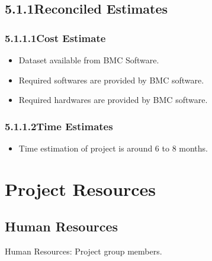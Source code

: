 \documentclass[oneside,a4paper,12pt]{book}
\begin{document}
\subsection*{5.1.1\hspace*{10pt}Reconciled Estimates}


\subsubsection*{5.1.1.1\hspace*{10pt}Cost Estimate}
\setlength{\parskip}{0.0pt}
\begin{itemize}
	\item Dataset available from BMC Software.\par

	\item Required softwares are provided by BMC software.\par

	\item Required hardwares are provided by BMC software.
\end{itemize}\par


\subsubsection*{5.1.1.2\hspace*{10pt}Time Estimates}
\begin{itemize}
	\item Time estimation of project is around 6 to 8 months.
\end{itemize}\par


\section{Project Resources}

\subsection{Human Resources}


\par Human Resources: Project group members.
\end{document}
